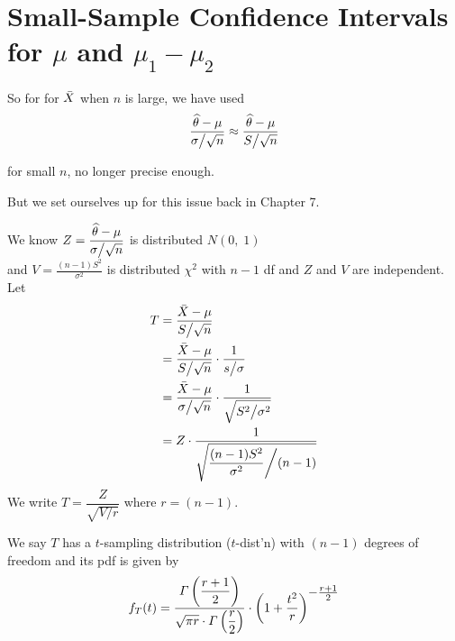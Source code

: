 \section{Small-Sample Confidence Intervals for $\mu$ and $\mu_1 - \mu_2$}

\nl So for for $\bar{X}$ when $n$ is large, we have used
$$\frac{\widehat{\theta} - \mu}{\sigma \big/ \sqrt{n}} \approx \frac{\widehat{\theta} - \mu}{S \big/ \sqrt{n}}$$
\begin{center}{\color{red} for small $n$, no longer precise enough.}\end{center}

\nl But we set ourselves up for this issue back in Chapter 7.

\recall* We know $\displaystyle Z = \frac{\widehat{\theta} - \mu}{\sigma \big/ \sqrt{n}}$ is distributed $N(0,\;1)$
\\and $\displaystyle V = \frac{(n-1)S^2}{\sigma^2}$ is distributed $\chi^2$ with $n-1$ df and $Z$ and $V$ are independent. Let
\begin{align*}
    T &= \frac{\Xbar - \mu}{S \big/ \sqrt{n}}\\
    &= \frac{\Xbar - \mu}{S \big/ \sqrt{n}} \cdot \over{s \big/ \sigma}\\
    &= \frac{\Xbar - \mu}{\sigma \big/ \sqrt{n}} \cdot \over{\sqrt{S^2 \big/ \sigma^2}}\\
    &= Z \cdot \frac{1}{\sqrt{\displaystyle\frac{(n-1)S^2}{\sigma^2} \bigg/ (n-1)}}
\end{align*}
We write $T = \dfrac{Z}{\sqrt{V \big/ r}}$ where $r = (n-1)$. \\

 We say $T$ has a $t$-sampling distribution ($t$-dist'n) with $(n-1)$ degrees of freedom and its pdf is given by
$$f_T(t) = \dfrac{\varGamma \pars{\dfrac{r+1}{2}}}{\sqrt{\pi r} \cdot \varGamma \pars{\dfrac{r}{2}}} \cdot \pars{1 + \dfrac{t^2}{r}}^{\textstyle-\frac{r+1}{2} }$$

